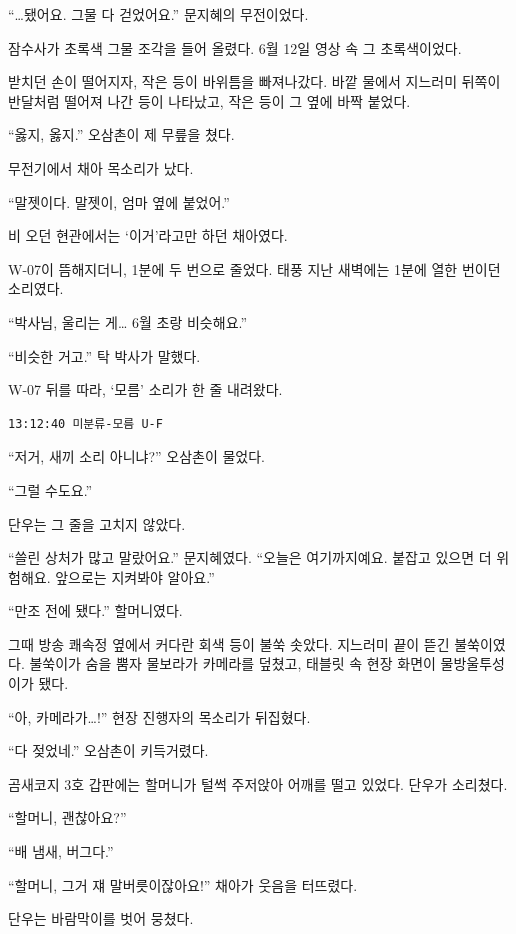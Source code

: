 \documentclass[
  korean,
  letterpaper,
  twoside,
  open=any,
  fontsize=12.5pt,
  headings=small]{scrbook}
\newcommand{\logfont}{\linespread{1}\fontsize{10.8}{15.2}\selectfont}
\begin{document}
``\ldots 됐어요. 그물 다
걷었어요.'' 문지혜의
무전이었다.

잠수사가 초록색 그물 조각을
들어 올렸다. 6월 12일 영상 속
그 초록색이었다.

받치던 손이 떨어지자, 작은
등이 바위틈을 빠져나갔다. 바깥
물에서 지느러미 뒤쪽이
반달처럼 떨어져 나간 등이
나타났고, 작은 등이 그 옆에
바짝 붙었다.

``옳지, 옳지.'' 오삼촌이 제
무릎을 쳤다.

무전기에서 채아 목소리가 났다.

``말젯이다. 말젯이, 엄마 옆에
붙었어.''

비 오던 현관에서는
`이거'라고만 하던 채아였다.

W-07이 뜸해지더니, 1분에 두
번으로 줄었다. 태풍 지난
새벽에는 1분에 열한 번이던
소리였다.

``박사님, 울리는 게\ldots{}
6월 초랑 비슷해요.''

``비슷한 거고.'' 탁 박사가
말했다.

W-07 뒤를 따라, `모름' 소리가
한 줄 내려왔다.

\begin{Verbatim}[samepage=true,frame=single,framesep=2.5mm,rulecolor=\color{gray},formatcom=\logfont]
13:12:40 미분류-모름 U-F
\end{Verbatim}

``저거, 새끼 소리 아니냐?''
오삼촌이 물었다.

``그럴 수도요.''

단우는 그 줄을 고치지 않았다.

``쓸린 상처가 많고 말랐어요.''
문지혜였다. ``오늘은
여기까지예요. 붙잡고 있으면 더
위험해요. 앞으로는 지켜봐야
알아요.''

``만조 전에 됐다.''
할머니였다.

그때 방송 쾌속정 옆에서 커다란
회색 등이 불쑥 솟았다.
지느러미 끝이 뜯긴 불쑥이였다.
불쑥이가 숨을 뿜자 물보라가
카메라를 덮쳤고, 태블릿 속
현장 화면이 물방울투성이가
됐다.

``아, 카메라가\ldots!'' 현장
진행자의 목소리가 뒤집혔다.

``다 젖었네.'' 오삼촌이
키득거렸다.

곰새코지 3호 갑판에는 할머니가
털썩 주저앉아 어깨를 떨고
있었다. 단우가 소리쳤다.

``할머니, 괜찮아요?''

``배 냄새, 버그다.''

``할머니, 그거 쟤
말버릇이잖아요!'' 채아가
웃음을 터뜨렸다.

단우는 바람막이를 벗어 뭉쳤다.
\end{document}
